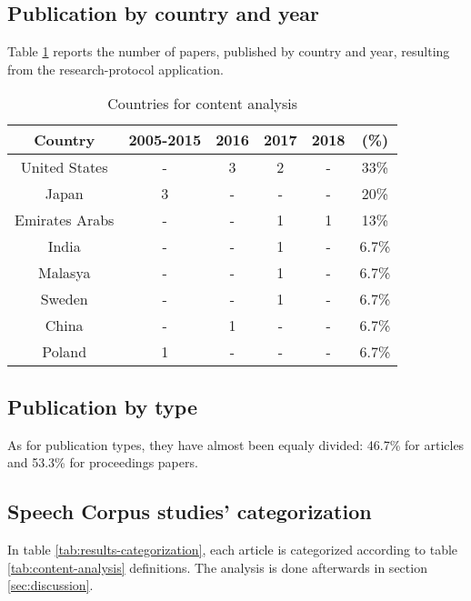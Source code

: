 \documentclass[conference]{IEEEtran}
\begin{document}
\subsection{Publication by country and year}

Table \ref{tab:country-analysis} reports the number of papers, published by country and year, resulting from the research-protocol application.

\begin{table}[h]
    \centering
    \begin{tabular}{|c|c|c|c|c|c|}
        \hline Country & 2005-2015 & 2016 & 2017 & 2018 & (\%) \\ \hline
        United States & - & 3 & 2 & - & 33\% \\ \hline 
        Japan & 3 & - & - & - & 20\% \\ \hline
        Emirates Arabs & - & - & 1 & 1 & 13\% \\ \hline
        India & - & - & 1 & - & 6.7\% \\ \hline
        Malasya & - & - & 1 & - & 6.7\% \\ \hline
        Sweden & - & - & 1 & - & 6.7\% \\ \hline
        China & - & 1 & - & - & 6.7\% \\ \hline
        Poland & 1 & - & - & - & 6.7\% \\ \hline
    \end{tabular}
    \caption{Countries for content analysis}
    \label{tab:country-analysis}
\end{table}

\subsection{Publication by type}

As for publication types, they have almost been equaly divided: 46.7\% for articles and 53.3\% for proceedings papers.

\subsection{Speech Corpus studies' categorization}

In table \ref{tab:results-categorization}, each article is categorized according to table \ref{tab:content-analysis} definitions. The analysis is done afterwards in section \ref{sec:discussion}.
\end{document}
